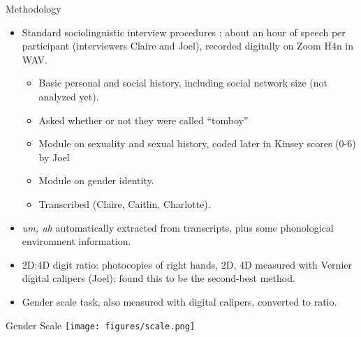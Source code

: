 \documentclass[hyperref={pdfpagelabels=false}]{beamer}
\begin{document}
\begin{frame}{Methodology}
\begin{itemize}
	\item Standard sociolinguistic interview procedures \citep{tagliamonte2006}; about an hour of speech per participant (interviewers Claire and Joel), recorded digitally on Zoom H4n in WAV.
		\begin{itemize}
			\item Basic personal and social history, including social network size (not analyzed yet).
			\item Asked whether or not they were called ``tomboy''
			\item Module on sexuality and sexual history, coded later in Kinsey scores (0-6) by Joel
			\item Module on gender identity.
			\item Transcribed (Claire, Caitlin, Charlotte).
		\end{itemize}
	\item \textsl{um, uh} automatically extracted from transcripts, plus some phonological environment information.
	\item 2D:4D digit ratio: photocopies of right hands, 2D, 4D measured with Vernier digital calipers (Joel); \citet{allawayetal2009} found this to be the second-best method.
	\item Gender scale task, also measured with digital calipers, converted to ratio.
\end{itemize}
\end{frame}

\begin{frame}{Gender Scale}
	\texttt{[image: figures/scale.png]}
\end{frame}
\end{document}
